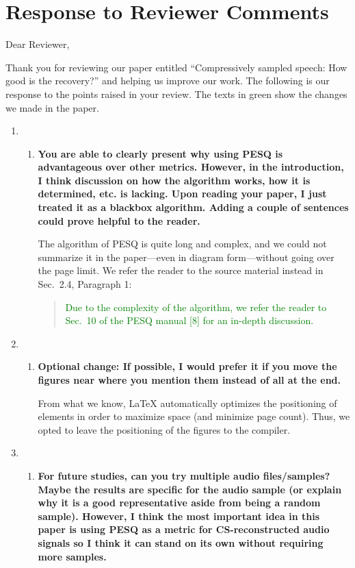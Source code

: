 \documentclass[a4paper,12pt]{article}
\begin{document}
\section*{Response to Reviewer Comments}

Dear Reviewer,

Thank you for reviewing our paper entitled ``Compressively sampled speech: How good is the recovery?'' and helping us improve our work. The following is our response to the points raised in your review. The texts in green show the changes we made in the paper.

\begin{enumerate}
	\item
	\begin{enumerate}
		\item \textbf{You are able to clearly present why using PESQ is advantageous over other metrics. However, in the introduction, I think discussion on how the algorithm works, how it is determined, etc. is lacking. Upon reading your paper, I just treated it as a blackbox algorithm. Adding a couple of sentences could prove helpful to the reader.}
		
		The algorithm of PESQ is quite long and complex, and we could not summarize it in the paper---even in diagram form---without going over the page limit. We refer the reader to the source material instead in Sec.~2.4, Paragraph 1:
		
		\begin{quotation}
			\textcolor{Green}{Due to the complexity of the algorithm, we refer the reader to Sec.~10 of the PESQ manual [8] for an in-depth discussion.}
		\end{quotation}
	\end{enumerate}
	
	\item
	\begin{enumerate}
		\item \textbf{Optional change: If possible, I would prefer it if you move the figures near where you mention them instead of all at the end.}
		
		From what we know, LaTeX automatically optimizes the positioning of elements in order to maximize space (and minimize page count). Thus, we opted to leave the positioning of the figures to the compiler.
	\end{enumerate}
	
	\item
	\begin{enumerate}
		\item \textbf{For future studies, can you try multiple audio files/samples? Maybe the results are specific for the audio sample (or explain why it is a good representative aside from being a random sample). However, I think the most important idea in this paper is using PESQ as a metric for CS-reconstructed audio signals so I think it can stand on its own without requiring more samples.}
		

\end{enumerate}
\end{enumerate}
\end{document}
